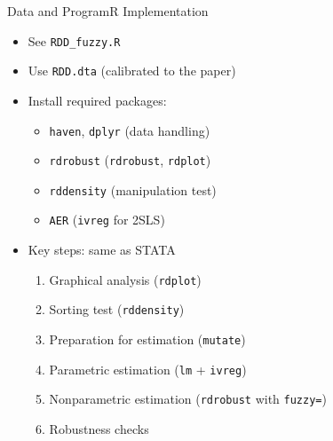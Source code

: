 \documentclass[hyperref={pdfpagelabels=false}]{beamer}
\begin{document}
\begin{frame}{Data and Program}{R Implementation}
	\begin{itemize}
		\item See \texttt{RDD\_fuzzy.R}
		\vspace{0.2cm}
		\item Use \texttt{RDD.dta} (calibrated to the paper)
		\vspace{0.2cm}
		\item Install required packages:
		\begin{itemize}
			\vspace{0.2cm}
			\item \texttt{haven}, \texttt{dplyr} (data handling)
			\item \texttt{rdrobust} (\texttt{rdrobust}, \texttt{rdplot})
			\item \texttt{rddensity} (manipulation test)
			\item \texttt{AER} (\texttt{ivreg} for 2SLS)
		\end{itemize}
		\vspace{0.2cm}
		\item Key steps: same as STATA
		\begin{enumerate}
			\vspace{0.2cm}
			\item Graphical analysis (\texttt{rdplot})
			\item Sorting test (\texttt{rddensity})
			\item Preparation for estimation (\texttt{mutate})
			\item Parametric estimation (\texttt{lm} + \texttt{ivreg})
			\item Nonparametric estimation (\texttt{rdrobust} with \texttt{fuzzy=})
			\item Robustness checks
		\end{enumerate}
	\end{itemize}
\end{frame}
\end{document}
